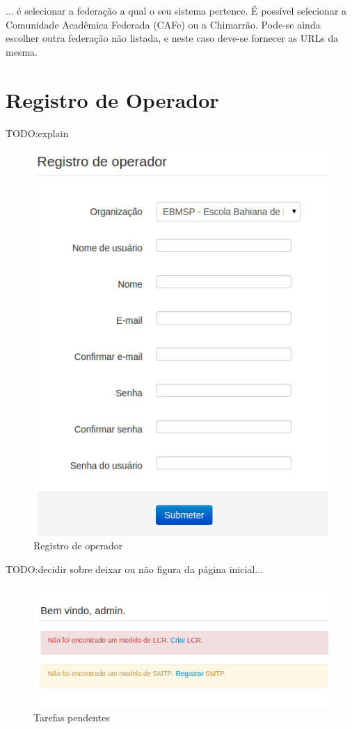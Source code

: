     ... é selecionar a federação a qual o seu sistema pertence. É possível selecionar a Comunidade Acadêmica Federada (CAFe) ou a Chimarrão. Pode-se ainda escolher outra federação não listada, e neste caso deve-se fornecer as URLs da mesma.
    
    
\section{Registro de Operador}
TODO:explain
    
    \begin{figure}[h]
     \centering
     \includegraphics[scale=0.5]{images/inicioregistroop.png}
     \caption{Registro de operador}
     \label{fig:inicioregop}
\end{figure}

TODO:decidir sobre deixar ou não figura da página inicial...
    
    \begin{figure}[h]
     \centering
     \includegraphics[scale=0.5]{images/pendencias.png}
     \caption{Tarefas pendentes}
     \label{fig:pendencias}
\end{figure}